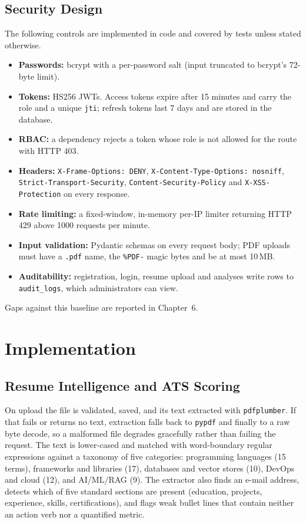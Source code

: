 \documentclass[openany]{tietreport}
\newcommand{\code}[1]{\texttt{\small #1}}
\begin{document}
\section{Security Design}
The following controls are implemented in code and covered by tests unless stated otherwise.
\begin{itemize}
  \item \textbf{Passwords:} bcrypt with a per-password salt (input truncated to bcrypt's 72-byte limit).
  \item \textbf{Tokens:} HS256 JWTs. Access tokens expire after 15 minutes and carry the role and a unique \code{jti}; refresh tokens last 7 days and are stored in the database.
  \item \textbf{RBAC:} a dependency rejects a token whose role is not allowed for the route with HTTP 403.
  \item \textbf{Headers:} \code{X-Frame-Options: DENY}, \code{X-Content-Type-Options: nosniff}, \code{Strict-Transport-Security}, \code{Content-Security-Policy} and \code{X-XSS-Protection} on every response.
  \item \textbf{Rate limiting:} a fixed-window, in-memory per-IP limiter returning HTTP 429 above 1000 requests per minute.
  \item \textbf{Input validation:} Pydantic schemas on every request body; PDF uploads must have a \code{.pdf} name, the \code{\%PDF-} magic bytes and be at most 10\,MB.
  \item \textbf{Auditability:} registration, login, resume upload and analyses write rows to \code{audit\_logs}, which administrators can view.
\end{itemize}
Gaps against this baseline are reported in Chapter~6.

\chapter{Implementation}

\section{Resume Intelligence and ATS Scoring}
\label{sec:ats}
On upload the file is validated, saved, and its text extracted with \code{pdfplumber}. If that fails or returns no text, extraction falls back to \code{pypdf} and finally to a raw byte decode, so a malformed file degrades gracefully rather than failing the request. The text is lower-cased and matched with word-boundary regular expressions against a taxonomy of five categories: programming languages (15 terms), frameworks and libraries (17), databases and vector stores (10), DevOps and cloud (12), and AI/ML/RAG (9). The extractor also finds an e-mail address, detects which of five standard sections are present (education, projects, experience, skills, certifications), and flags weak bullet lines that contain neither an action verb nor a quantified metric.
\end{document}
